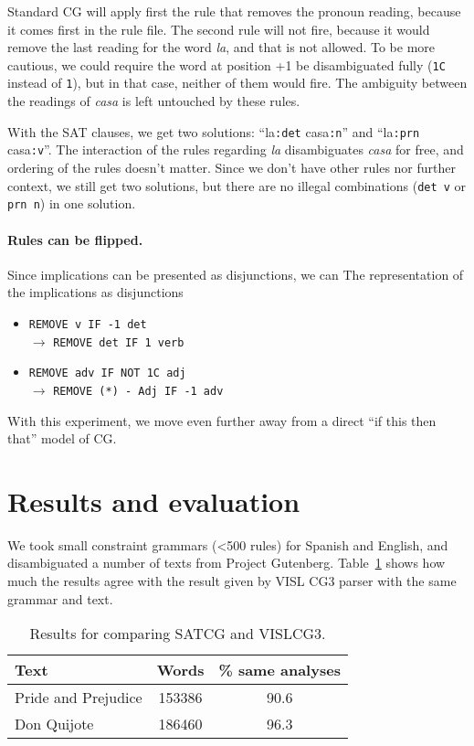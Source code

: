 \documentclass[11pt]{article}
\begin{document}
Standard CG will apply first the rule that removes the pronoun reading, because it comes first in the rule file.
The second rule will not fire, because it would remove the last reading for the word \emph{la}, and that is not allowed. To be more cautious, we could require the word at position +1 be disambiguated fully (\texttt{1C} instead of \texttt{1}), but in that case, neither of them would fire. The ambiguity between the readings of \emph{casa} is left untouched by these rules.

With the SAT clauses, we get two solutions: ``la\texttt{:det} casa\texttt{:n}''  and ``la\texttt{:prn} casa\texttt{:v}''. The interaction of the rules regarding \emph{la}  disambiguates \emph{casa} for free, and ordering of the rules doesn't matter. Since we don't have other rules nor further context, we still get two solutions, but there are no illegal combinations (\texttt{det v} or \texttt{prn n}) in one solution.

\paragraph{Rules can be flipped.}
Since implications can be presented as disjunctions, we can 
The representation of the implications as disjunctions 
\begin{itemize}
\item [] \texttt{REMOVE v IF -1 det} \\ $\rightarrow$ \texttt{REMOVE det IF 1 verb}   
\item [] \texttt{REMOVE adv IF NOT 1C adj} \\ $\rightarrow$ \texttt{REMOVE (*) - Adj  IF -1 adv}  \\
\end{itemize}

With this experiment, we move even further away from a direct ``if this then that'' model of CG.

\section{Results and evaluation}

We took small constraint grammars (\textless{}500 rules) for Spanish and English, and disambiguated a number of texts from Project Gutenberg. Table~\ref{table:results} shows how much the results agree with the result given by VISL CG3 parser with the same grammar and text.

\begin{table}
  \centering
  \begin{tabular}{|l|c|c|}
     \hline
    \textbf{Text} & \textbf{Words} & \textbf{\% same analyses} \\
    \hline
	Pride and Prejudice & 153386 & 90.6 \\  
    \hline
       Don Quijote & 186460 & 96.3  \\ 
     \hline
  \end{tabular}
  \caption{Results for comparing SATCG and VISLCG3.}
  \label{table:results}
\end{table}
\end{document}
